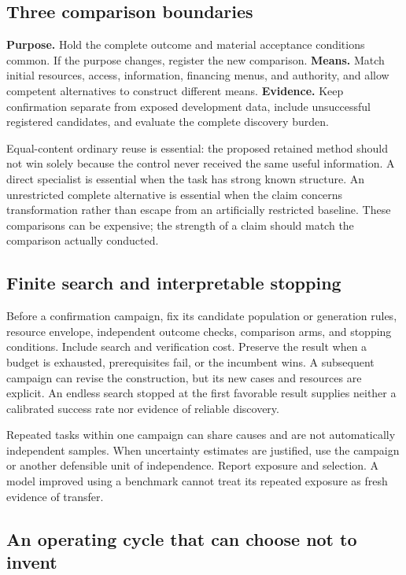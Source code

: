 \documentclass[10pt,a4paper]{article}
\begin{document}
\subsection{Three comparison boundaries}

\textbf{Purpose.} Hold the complete outcome and material acceptance conditions common. If the purpose changes, register the new comparison. \textbf{Means.} Match initial resources, access, information, financing menus, and authority, and allow competent alternatives to construct different means. \textbf{Evidence.} Keep confirmation separate from exposed development data, include unsuccessful registered candidates, and evaluate the complete discovery burden.

Equal-content ordinary reuse is essential: the proposed retained method should not win solely because the control never received the same useful information. A direct specialist is essential when the task has strong known structure. An unrestricted complete alternative is essential when the claim concerns transformation rather than escape from an artificially restricted baseline. These comparisons can be expensive; the strength of a claim should match the comparison actually conducted.

\subsection{Finite search and interpretable stopping}

Before a confirmation campaign, fix its candidate population or generation rules, resource envelope, independent outcome checks, comparison arms, and stopping conditions. Include search and verification cost. Preserve the result when a budget is exhausted, prerequisites fail, or the incumbent wins. A subsequent campaign can revise the construction, but its new cases and resources are explicit. An endless search stopped at the first favorable result supplies neither a calibrated success rate nor evidence of reliable discovery.

Repeated tasks within one campaign can share causes and are not automatically independent samples. When uncertainty estimates are justified, use the campaign or another defensible unit of independence. Report exposure and selection. A model improved using a benchmark cannot treat its repeated exposure as fresh evidence of transfer.

\subsection{An operating cycle that can choose not to invent}
\end{document}

